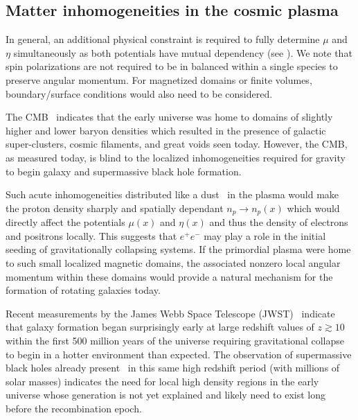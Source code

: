 \subsection{Matter inhomogeneities in the cosmic plasma}
\label{sec:inhomogeneous}
\noindent In general, an additional physical constraint is required to fully determine $\mu$ and $\eta$ simultaneously as both potentials have mutual dependency (see ). We note that spin polarizations are not required to be in balanced within a single species to preserve angular momentum. For magnetized domains or finite volumes, boundary/surface conditions would also need to be considered.

The CMB~\citep{Planck:2018vyg} indicates that the early universe was home to domains of slightly higher and lower baryon densities which resulted in the presence of galactic super-clusters, cosmic filaments, and great voids seen today. However, the CMB, as measured today, is blind to the localized inhomogeneities required for gravity to begin galaxy and supermassive black hole formation.

Such acute inhomogeneities distributed like a dust~\citep{Grayson:2023flr} in the plasma would make the proton density sharply and spatially dependant $n_{p}\rightarrow n_{p}(x)$ which would directly affect the potentials $\mu(x)$ and $\eta(x)$ and thus the density of electrons and positrons locally. This suggests that $e^{+}e^{-}$ may play a role in the initial seeding of gravitationally collapsing systems. If the primordial plasma were home to such small localized magnetic domains, the associated nonzero local angular momentum within these domains would provide a natural mechanism for the formation of rotating galaxies today.

Recent measurements by the James Webb Space Telescope (JWST)~\citep{Yan:2022sxd,adams2023discovery,arrabal2023spectroscopic} indicate that galaxy formation began surprisingly early at large redshift values of $z\gtrsim10$ within the first 500 million years of the universe requiring gravitational collapse to begin in a hotter environment than expected. The observation of supermassive black holes already present~\citep{CEERSTeam:2023qgy} in this same high redshift period (with millions of solar masses) indicates the need for local high density regions in the early universe whose generation is not yet explained and likely need to exist long before the recombination epoch.
